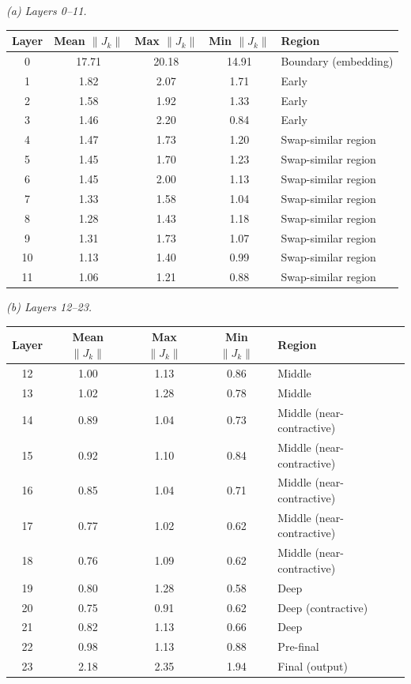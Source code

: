 \documentclass{article}
\newenvironment{tabhere}{%
  \par\medskip
  \begin{center}
}{%
  \end{center}
  \medskip
}
\begin{document}
\begin{tabhere}
\normalsize
\setlength{\tabcolsep}{6pt}


\noindent\textit{(a) Layers 0--11.}
\begin{tabular}{@{}ccccl@{}}
\toprule
Layer & Mean $\|J_k\|$ & Max $\|J_k\|$ & Min $\|J_k\|$ & Region \\
\midrule
0 & 17.71 & 20.18 & 14.91 & Boundary (embedding) \\
1 & 1.82 & 2.07 & 1.71 & Early \\
2 & 1.58 & 1.92 & 1.33 & Early \\
3 & 1.46 & 2.20 & 0.84 & Early \\
4 & 1.47 & 1.73 & 1.20 & Swap-similar region \\
5 & 1.45 & 1.70 & 1.23 & Swap-similar region \\
6 & 1.45 & 2.00 & 1.13 & Swap-similar region \\
7 & 1.33 & 1.58 & 1.04 & Swap-similar region \\
8 & 1.28 & 1.43 & 1.18 & Swap-similar region \\
9 & 1.31 & 1.73 & 1.07 & Swap-similar region \\
10 & 1.13 & 1.40 & 0.99 & Swap-similar region \\
11 & 1.06 & 1.21 & 0.88 & Swap-similar region \\
\bottomrule
\end{tabular}

\vspace{0.75em}
\noindent\textit{(b) Layers 12--23.}
\begin{tabular}{@{}ccccl@{}}
\toprule
Layer & Mean $\|J_k\|$ & Max $\|J_k\|$ & Min $\|J_k\|$ & Region \\
\midrule
12 & 1.00 & 1.13 & 0.86 & Middle \\
13 & 1.02 & 1.28 & 0.78 & Middle \\
14 & 0.89 & 1.04 & 0.73 & Middle (near-contractive) \\
15 & 0.92 & 1.10 & 0.84 & Middle (near-contractive) \\
16 & 0.85 & 1.04 & 0.71 & Middle (near-contractive) \\
17 & 0.77 & 1.02 & 0.62 & Middle (near-contractive) \\
18 & 0.76 & 1.09 & 0.62 & Middle (near-contractive) \\
19 & 0.80 & 1.28 & 0.58 & Deep \\
20 & 0.75 & 0.91 & 0.62 & Deep (contractive) \\
21 & 0.82 & 1.13 & 0.66 & Deep \\
22 & 0.98 & 1.13 & 0.88 & Pre-final \\
23 & 2.18 & 2.35 & 1.94 & Final (output) \\
\bottomrule
\end{tabular}
\label{tab:jacobian}
\end{tabhere}
\end{document}
